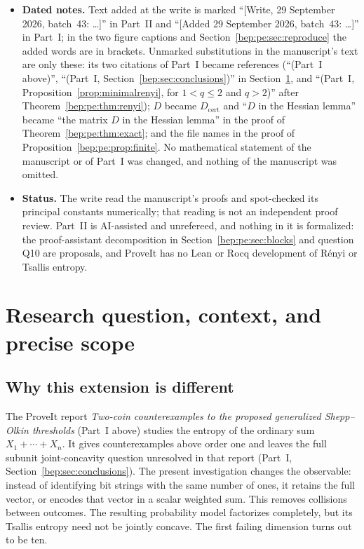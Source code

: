 \documentclass[11pt]{article}
\numberwithin{equation}{section}
\theoremstyle{definition}
\theoremstyle{remark}
\begin{document}
\begin{itemize}
Part~I's Proposition~\ref{prop:separate} that one coin is never a Tsallis
counterexample; and the separate-coordinate clause of
Proposition~\ref{bep:pe:prop:quasiconcavity} is the product-model
counterpart of Proposition~\ref{prop:separate}. The rest of Part~II
concerns the joint vector and has no counterpart in Part~I.
\item \textbf{Dated notes.} Text added at the write is marked
``[Write, 29 September 2026, batch~43: \ldots]'' in Part~II and
``[Added 29 September 2026, batch~43: \ldots]'' in Part~I; in the two
figure captions and Section~\ref{bep:pe:sec:reproduce} the added words
are in brackets. Unmarked substitutions in the manuscript's text are
only these: its two citations of Part~I became references (``(Part~I
above)'', ``(Part~I, Section~\ref{bep:sec:conclusions})'' in
Section~\ref{bep:pe:sec:question}, and ``(Part~I,
Proposition~\ref{prop:minimalrenyi}, for $1<q\leq2$ and $q>2$)'' after
Theorem~\ref{bep:pe:thm:renyi}); $D$ became $D_{\mathrm{cert}}$ and ``$D$
in the Hessian lemma'' became ``the matrix $D$ in the Hessian lemma'' in
the proof of Theorem~\ref{bep:pe:thm:exact}; and the file names in the
proof of Proposition~\ref{bep:pe:prop:finite}. No mathematical statement
of the manuscript or of Part~I was changed, and nothing of the manuscript
was omitted.
\item \textbf{Status.} The write read the manuscript's proofs and spot-checked
its principal constants numerically; that reading is not an independent
proof review. Part~II is AI-assisted and unrefereed, and nothing in it is
formalized: the proof-assistant decomposition in
Section~\ref{bep:pe:sec:blocks} and question Q10 are proposals, and
ProveIt has no Lean or Rocq development of R\'enyi or Tsallis entropy.
\end{itemize}

\section{Research question, context, and precise scope}\label{bep:pe:sec:question}
\subsection{Why this extension is different}
The ProveIt report \emph{Two-coin counterexamples to the proposed generalized
Shepp--Olkin thresholds} (Part~I above) studies the entropy of the
ordinary sum $X_1+\cdots+X_n$. It gives counterexamples above order one
and leaves the full subunit joint-concavity question unresolved in that
report (Part~I, Section~\ref{bep:sec:conclusions}). The present
investigation changes the observable:
instead of identifying bit strings with the same number of ones, it
retains the full vector, or encodes that vector in a scalar weighted sum.
This removes collisions between outcomes. The resulting probability
model factorizes completely, but its Tsallis entropy need not be jointly
concave. The first failing dimension turns out to be ten.
\end{document}
